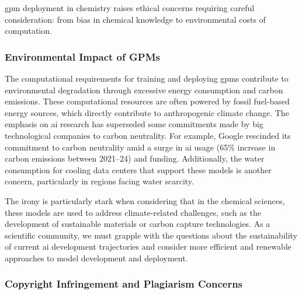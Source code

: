 \gls{gpm} deployment in chemistry raises ethical concerns requiring careful consideration: from bias in chemical knowledge to environmental costs of computation.\autocite{crawford2021atlas}


\subsubsection{Environmental Impact of GPMs}

The computational requirements for training and deploying \glspl{gpm} contribute to environmental degradation through excessive energy consumption and carbon emissions. \autocite{spotte-smith2025considering, nature2023carbon} 
These computational resources are often powered by fossil fuel-based energy sources, which directly contribute to anthropogenic climate change. \autocite{strubell2019energy} 
The emphasis on \gls{ai} research has superseded some commitments made by big technological companies to carbon neutrality. 
For example, Google rescinded its commitment to carbon neutrality amid a surge in \gls{ai} usage (65$\%$ increase in carbon emissions between 2021--24) and funding.\autocite{bhuiyan2025google} 
Additionally, the water consumption for cooling data centers that support these models is another concern, particularly in regions facing water scarcity. \autocite{mytton2021data}

The irony is particularly stark when considering that in the chemical sciences, these models are used to address climate-related challenges, such as the development of sustainable materials or carbon capture technologies. 
As a scientific community, we must grapple with the questions about the sustainability of current \gls{ai} development trajectories and consider more efficient and renewable approaches to model development and deployment. \autocite{kolbert2024obscene}


\subsubsection{Copyright Infringement and Plagiarism Concerns}

